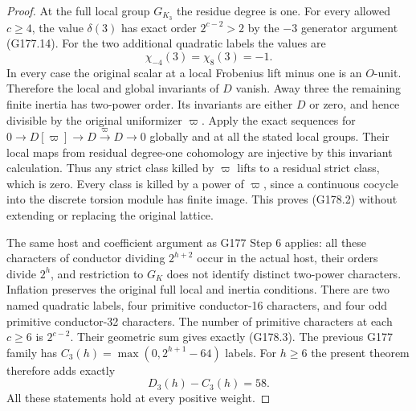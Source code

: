 \begin{proof}
At the full local group $G_{K_3}$ the residue degree is one.
For every allowed $c\geq4$, the value $\delta(3)$ has exact order
$2^{c-2}>2$ by the $-3$ generator argument (G177.14).
For the two additional quadratic labels the values are
\[
                    \chi_{-4}(3)=\chi_8(3)=-1.
 \tag{G178.10}
\]
In every case the original scalar at a local Frobenius lift minus
one is an $O$-unit.  Therefore the local and global invariants
of $D$ vanish.
Away three the remaining finite inertia has two-power order.
Its invariants are either $D$ or zero, and hence divisible by the
original uniformizer $\varpi$.
Apply the exact sequences for
$0\to D[\varpi]\to D\xrightarrow{\varpi}D\to0$
globally and at all the stated local groups.
Their local maps from residual degree-one cohomology are injective
by this invariant calculation.  Thus any strict class killed by
$\varpi$ lifts to a residual strict class, which is zero.
Every class is killed by a power of $\varpi$, since a continuous
cocycle into the discrete torsion module has finite image.
This proves (G178.2) without extending or replacing the original lattice.

The same host and coefficient argument as G177 Step 6 applies:
all these characters of conductor dividing $2^{h+2}$ occur in
the actual host, their orders divide $2^h$, and restriction to
$G_K$ does not identify distinct two-power characters.
Inflation preserves the original full local and inertia conditions.
There are two named quadratic labels, four primitive conductor-16
characters, and four odd primitive conductor-32 characters.
The number of primitive characters at each $c\geq6$ is $2^{c-2}$.
Their geometric sum gives exactly (G178.3).
The previous G177 family has $C_3(h)=\max(0,2^{h+1}-64)$ labels.
For $h\geq6$ the present theorem therefore adds exactly
\[
                      D_3(h)-C_3(h)=58.
 \tag{G178.11}
\]
All these statements hold at every positive weight.


\end{proof}
